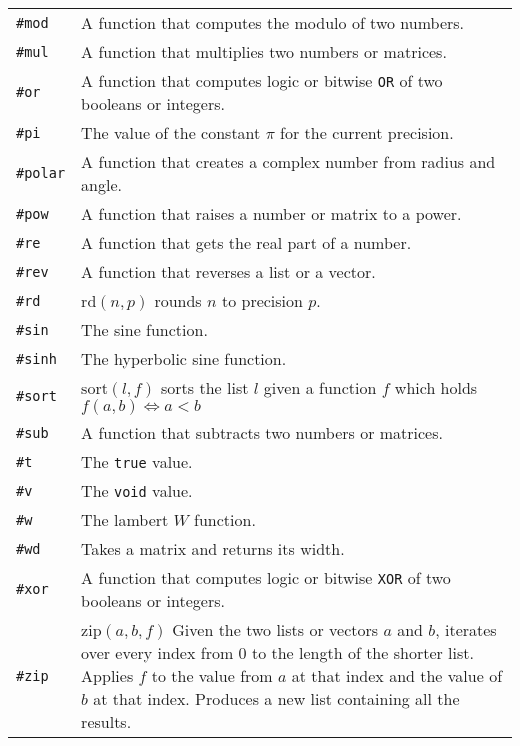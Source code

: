 \documentclass[10pt]{article}
\begin{document}
\begin{longtable}{p{}p{}}
        \verb|#mod|    & A function that computes the modulo of two numbers. \\
        \verb|#mul|    & A function that multiplies two numbers or matrices. \\
        \verb|#or|     & A function that computes logic or bitwise \verb|OR| of two booleans or integers. \\
        \verb|#pi|     & The value of the constant $ \pi $ for the current precision. \\
        \verb|#polar|  & A function that creates a complex number from radius and angle. \\
        \verb|#pow|    & A function that raises a number or matrix to a power. \\
        \verb|#re|     & A function that gets the real part of a number. \\
        \verb|#rev|    & A function that reverses a list or a vector. \\
        \verb|#rd |    & $ \mathrm{rd}(n,p) $ rounds $ n $ to precision $ p $. \\
        \verb|#sin|    & The sine function. \\
        \verb|#sinh|   & The hyperbolic sine function. \\
        \verb|#sort|   & $ \mathrm{sort}(l,f) $ sorts the list $ l $ given a function $ f $ which holds $ f(a,b) \iff a < b $ \\
        \verb|#sub|    & A function that subtracts two numbers or matrices. \\
        \verb|#t|      & The \verb|true| value. \\
        \verb|#v|      & The \verb|void| value. \\
        \verb|#w|      & The lambert $ W $ function. \\
        \verb|#wd|     & Takes a matrix and returns its width. \\
        \verb|#xor|    & A function that computes logic or bitwise \verb|XOR| of two booleans or integers. \\
        \verb|#zip|    & $ \mathrm{zip}(a,b,f) $ Given the two lists or vectors $ a $ and $ b $, iterates over every index from $ 0 $ to the length of the shorter list.
                         Applies $ f $ to the value from $ a $ at that index and the value of $ b $ at that index.
                         Produces a new list containing all the results. \\
    \end{longtable}
\end{document}
